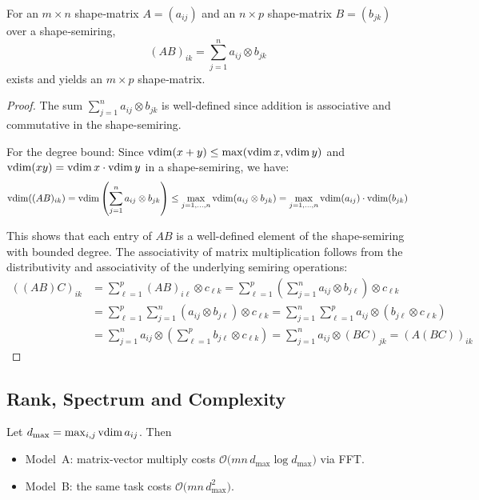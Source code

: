 \begin{theorem}
For an $m\times n$ shape‑matrix $A=(a_{ij})$ and an $n\times p$ shape‑matrix $B=(b_{jk})$ over a shape‑semiring,
\[(AB)_{ik}=\sum_{j=1}^{n} a_{ij}\otimes b_{jk}\] exists and yields an $m\times p$ shape‑matrix.
\end{theorem}
\begin{proof}
The sum $\sum_{j=1}^{n} a_{ij}\otimes b_{jk}$ is well-defined since addition is associative and commutative in the shape-semiring. 

For the degree bound: Since $\operatorname{vdim}(x+y) \leq \max(\operatorname{vdim} x, \operatorname{vdim} y)$ and $\operatorname{vdim}(xy) = \operatorname{vdim} x \cdot \operatorname{vdim} y$ in a shape-semiring, we have:
\[\operatorname{vdim}((AB)_{ik}) = \operatorname{vdim}\left(\sum_{j=1}^{n} a_{ij}\otimes b_{jk}\right) \leq \max_{j=1,\ldots,n} \operatorname{vdim}(a_{ij}\otimes b_{jk}) = \max_{j=1,\ldots,n} \operatorname{vdim}(a_{ij}) \cdot \operatorname{vdim}(b_{jk})\]

This shows that each entry of $AB$ is a well-defined element of the shape-semiring with bounded degree. The associativity of matrix multiplication follows from the distributivity and associativity of the underlying semiring operations:
\begin{align}
((AB)C)_{ik} &= \sum_{\ell=1}^{p} (AB)_{i\ell} \otimes c_{\ell k} = \sum_{\ell=1}^{p} \left(\sum_{j=1}^{n} a_{ij} \otimes b_{j\ell}\right) \otimes c_{\ell k} \\
&= \sum_{\ell=1}^{p} \sum_{j=1}^{n} (a_{ij} \otimes b_{j\ell}) \otimes c_{\ell k} = \sum_{j=1}^{n} \sum_{\ell=1}^{p} a_{ij} \otimes (b_{j\ell} \otimes c_{\ell k}) \\
&= \sum_{j=1}^{n} a_{ij} \otimes \left(\sum_{\ell=1}^{p} b_{j\ell} \otimes c_{\ell k}\right) = \sum_{j=1}^{n} a_{ij} \otimes (BC)_{jk} = (A(BC))_{ik}
\end{align}
\end{proof}

\subsection{Rank, Spectrum and Complexity}
\begin{theorem}[Complexity]\label{thm:complexity}
Let $d_{\max}=\max_{i,j}\operatorname{vdim} a_{ij}$.  Then
\begin{itemize}[leftmargin=1.5em]
  \item Model A: matrix‑vector multiply costs $\mathcal O\bigl(mn\,d_{\max}\log d_{\max}\bigr)$ via FFT.
  \item Model B: the same task costs $\mathcal O\bigl(mn\,d_{\max}^{2}\bigr)$.
\end{itemize}
\end{theorem}
